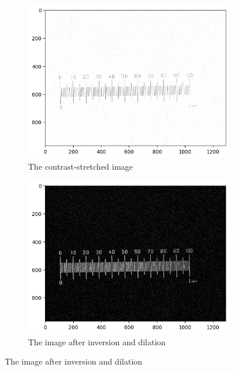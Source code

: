 \documentclass{article}
\begin{document}
\begin{figure}[h!]
  \begin{subfigure}{0.4\textwidth}
    \includegraphics[width=\linewidth]{Report/Appendix_Images/a4_contrast_stretched.png}
    \caption{The contrast-stretched image}
  \end{subfigure}
  \hfill
  \begin{subfigure}{0.4\textwidth}
    \includegraphics[width=\linewidth]{Report/Appendix_Images/a4_dilated.png}
    \caption{The image after inversion and dilation}
  \end{subfigure}


\end{figure}
\end{document}
